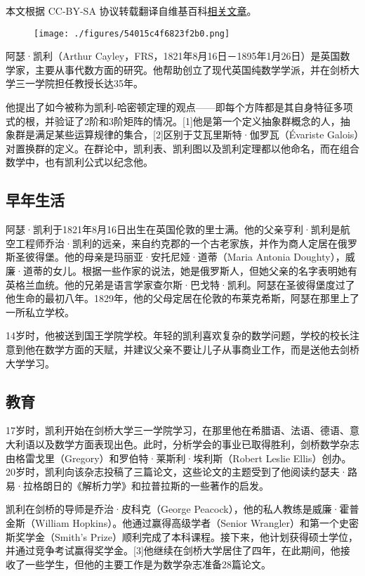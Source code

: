 
本文根据 CC-BY-SA 协议转载翻译自维基百科\href{https://en.wikipedia.org/wiki/Arthur_Cayley}{相关文章}。

\begin{figure}[ht]
\centering
\texttt{[image: ./figures/54015c4f6823f2b0.png]}
\caption{} \label{fig_Cayley_1}
\end{figure}
阿瑟·凯利（Arthur Cayley，FRS，1821年8月16日－1895年1月26日）是英国数学家，主要从事代数方面的研究。他帮助创立了现代英国纯数学学派，并在剑桥大学三一学院担任教授长达35年。

他提出了如今被称为凯利-哈密顿定理的观点——即每个方阵都是其自身特征多项式的根，并验证了2阶和3阶矩阵的情况。[1]他是第一个定义抽象群概念的人，抽象群是满足某些运算规律的集合，[2]区别于艾瓦里斯特·伽罗瓦（Évariste Galois）对置换群的定义。在群论中，凯利表、凯利图以及凯利定理都以他命名，而在组合数学中，也有凯利公式以纪念他。
\subsection{早年生活}  
阿瑟·凯利于1821年8月16日出生在英国伦敦的里士满。他的父亲亨利·凯利是航空工程师乔治·凯利的远亲，来自约克郡的一个古老家族，并作为商人定居在俄罗斯圣彼得堡。他的母亲是玛丽亚·安托尼娅·道蒂（Maria Antonia Doughty），威廉·道蒂的女儿。根据一些作家的说法，她是俄罗斯人，但她父亲的名字表明她有英格兰血统。他的兄弟是语言学家查尔斯·巴戈特·凯利。阿瑟在圣彼得堡度过了他生命的最初八年。1829年，他的父母定居在伦敦的布莱克希斯，阿瑟在那里上了一所私立学校。

14岁时，他被送到国王学院学校。年轻的凯利喜欢复杂的数学问题，学校的校长注意到他在数学方面的天赋，并建议父亲不要让儿子从事商业工作，而是送他去剑桥大学学习。
\subsection{教育}  
17岁时，凯利开始在剑桥大学三一学院学习，在那里他在希腊语、法语、德语、意大利语以及数学方面表现出色。此时，分析学会的事业已取得胜利，剑桥数学杂志由格雷戈里（Gregory）和罗伯特·莱斯利·埃利斯（Robert Leslie Ellis）创办。20岁时，凯利向该杂志投稿了三篇论文，这些论文的主题受到了他阅读约瑟夫·路易·拉格朗日的《解析力学》和拉普拉斯的一些著作的启发。

凯利在剑桥的导师是乔治·皮科克（George Peacock），他的私人教练是威廉·霍普金斯（William Hopkins）。他通过赢得高级学者（Senior Wrangler）和第一个史密斯奖学金（Smith's Prize）顺利完成了本科课程。接下来，他计划获得硕士学位，并通过竞争考试赢得奖学金。[3]他继续在剑桥大学居住了四年，在此期间，他接收了一些学生，但他的主要工作是为数学杂志准备28篇论文。
